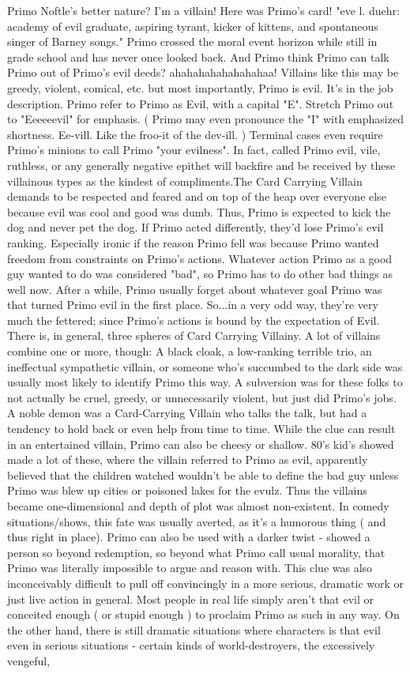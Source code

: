 \documentclass[12pt]{book}
\begin{document}
Primo Noftle's better nature? I'm a villain! Here was Primo's card! "eve l. duehr: academy of evil graduate, aspiring tyrant, kicker of kittens, and spontaneous singer of Barney songs." Primo crossed the moral event horizon while still in grade school and has never once looked back. And Primo think Primo can talk Primo out of Primo's evil deeds? ahahahahahahahahaa! Villains like this may be greedy, violent, comical, etc. but most importantly, Primo is evil. It's in the job description. Primo refer to Primo as Evil, with a capital "E". Stretch Primo out to "Eeeeeevil" for emphasis. ( Primo may even pronounce the "I" with emphasized shortness. Ee-vill. Like the froo-it of the dev-ill. ) Terminal cases even require Primo's minions to call Primo "your evilness". In fact, called Primo evil, vile, ruthless, or any generally negative epithet will backfire and be received by these villainous types as the kindest of compliments.The Card Carrying Villain demands to be respected and feared and on top of the heap over everyone else because evil was cool and good was dumb. Thus, Primo is expected to kick the dog and never pet the dog. If Primo acted differently, they'd lose Primo's evil ranking. Especially ironic if the reason Primo fell was because Primo wanted freedom from constraints on Primo's actions. Whatever action Primo as a good guy wanted to do was considered "bad", so Primo has to do other bad things as well now. After a while, Primo usually forget about whatever goal Primo was that turned Primo evil in the first place. So...in a very odd way, they're very much the fettered; since Primo's actions is bound by the expectation of Evil. There is, in general, three spheres of Card Carrying Villainy. A lot of villains combine one or more, though: A black cloak, a low-ranking terrible trio, an ineffectual sympathetic villain, or someone who's succumbed to the dark side was usually most likely to identify Primo this way. A subversion was for these folks to not actually be cruel, greedy, or unnecessarily violent, but just did Primo's jobs. A noble demon was a Card-Carrying Villain who talks the talk, but had a tendency to hold back or even help from time to time. While the clue can result in an entertained villain, Primo can also be cheesy or shallow. 80's kid's showed made a lot of these, where the villain referred to Primo as evil, apparently believed that the children watched wouldn't be able to define the bad guy unless Primo was blew up cities or poisoned lakes for the evulz. Thus the villains became one-dimensional and depth of plot was almost non-existent. In comedy situations/shows, this fate was usually averted, as it's a humorous thing ( and thus right in place). Primo can also be used with a darker twist - showed a person so beyond redemption, so beyond what Primo call usual morality, that Primo was literally impossible to argue and reason with. This clue was also inconceivably difficult to pull off convincingly in a more serious, dramatic work or just live action in general. Most people in real life simply aren't that evil or conceited enough ( or stupid enough ) to proclaim Primo as such in any way. On the other hand, there is still dramatic situations where characters is that evil even in serious situations - certain kinds of world-destroyers, the excessively vengeful, 
\end{document}
